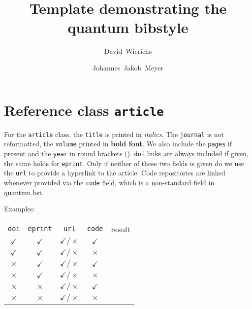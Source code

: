 \documentclass[a4paper,twocolumn,11pt]{quantumarticle}
\begin{document}
	\title{Template demonstrating the quantum bibstyle}
	
	\author{David~Wierichs}
    \author{Johannes~Jakob~Meyer}

	\maketitle
	\onecolumn
	\section{Reference class \texttt{article}}
	For the \texttt{article} class, the \texttt{title} is printed in \emph{italics}. The \texttt{journal} is not reformatted, the \texttt{volume} printed in \textbf{bold font}. We also include the \texttt{pages} if present and the \texttt{year} in round brackets ().
	\texttt{doi} links are always included if given, the same holds for \texttt{eprint}. Only if neither of these two fields is given do we use the \texttt{url} to provide a hyperlink to the article.
	Code repositories are linked whenever provided via the \texttt{code} field, which is a non-standard field in 
	quantum.bst. 
	
	Examples:
	
	\begin{tabular}{ccccc}
		\texttt{doi}& \texttt{eprint} & \texttt{url} & \texttt{code} & result \\
		$\checkmark$ & $\checkmark$ & $\checkmark\big / \times$ & $\checkmark$ & \citearticle{article_doi_eprint_url_code} \\
		$\checkmark$ & $\checkmark$ & $\checkmark\big / \times$ & $\times$ & \citearticle{article_doi_eprint_url} \\
		$\times$ & $\checkmark$ & $\checkmark\big / \times$ & $\checkmark$ & \citearticle{article_eprint_url_code} \\
		$\times$ & $\checkmark$ & $\checkmark\big / \times$ & $\times$ & \citearticle{article_eprint_url} \\
		$\times$ & $\times$ & $\checkmark\big / \times$ & $\checkmark$ & \citearticle{article_url_code} \\
		$\times$ & $\times$ & $\checkmark\big / \times$ & $\times$ & \citearticle{article_url} \\
	\end{tabular}
	
\end{document}
